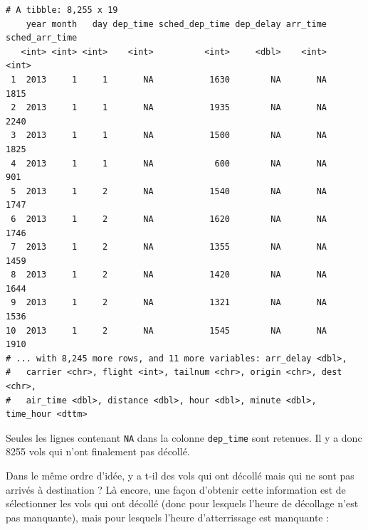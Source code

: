 \documentclass[a4paperpaper,]{article}
\newenvironment{Shaded}{\begin{snugshade}}{\end{snugshade}}
\newcommand{\KeywordTok}[1]{\textcolor[rgb]{0.12,0.11,0.11}{\textbf{#1}}}
\newcommand{\NormalTok}[1]{\textcolor[rgb]{0.12,0.11,0.11}{#1}}
\newcommand{\OperatorTok}[1]{\textcolor[rgb]{0.12,0.11,0.11}{#1}}
\newcommand{\StringTok}[1]{\textcolor[rgb]{0.75,0.01,0.01}{#1}}
\theoremstyle{definition}
\theoremstyle{definition}
\theoremstyle{definition}
\theoremstyle{remark}
\begin{document}
\begin{verbatim}
# A tibble: 8,255 x 19
    year month   day dep_time sched_dep_time dep_delay arr_time sched_arr_time
   <int> <int> <int>    <int>          <int>     <dbl>    <int>          <int>
 1  2013     1     1       NA           1630        NA       NA           1815
 2  2013     1     1       NA           1935        NA       NA           2240
 3  2013     1     1       NA           1500        NA       NA           1825
 4  2013     1     1       NA            600        NA       NA            901
 5  2013     1     2       NA           1540        NA       NA           1747
 6  2013     1     2       NA           1620        NA       NA           1746
 7  2013     1     2       NA           1355        NA       NA           1459
 8  2013     1     2       NA           1420        NA       NA           1644
 9  2013     1     2       NA           1321        NA       NA           1536
10  2013     1     2       NA           1545        NA       NA           1910
# ... with 8,245 more rows, and 11 more variables: arr_delay <dbl>,
#   carrier <chr>, flight <int>, tailnum <chr>, origin <chr>, dest <chr>,
#   air_time <dbl>, distance <dbl>, hour <dbl>, minute <dbl>, time_hour <dttm>
\end{verbatim}

Seules les lignes contenant \texttt{NA} dans la colonne
\texttt{dep\_time} sont retenues. Il y a donc 8255 vols qui n'ont
finalement pas décollé.

Dans le même ordre d'idée, y a t-il des vols qui ont décollé mais qui ne
sont pas arrivés à destination ? Là encore, une façon d'obtenir cette
information est de sélectionner les vols qui ont décollé (donc pour
lesquels l'heure de décollage n'est pas manquante), mais pour lesquels
l'heure d'atterrissage est manquante :

\begin{Shaded}
\end{Shaded}
\end{document}
